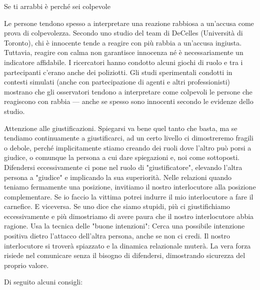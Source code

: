 \documentclass[12pt]{book} %
\begin{document}
\begin{mdframed}[linewidth=1pt]
Se ti arrabbi è perché sei colpevole

Le persone tendono spesso a interpretare una reazione rabbiosa a un'accusa come prova di colpevolezza. Secondo uno studio del team di DeCelles (Università di Toronto), chi è innocente tende a reagire con più rabbia a un'accusa ingiusta. Tuttavia, reagire con calma non garantisce innocenza né è necessariamente un indicatore affidabile. I ricercatori hanno condotto alcuni giochi di ruolo e
tra i partecipanti c'erano anche dei poliziotti. Gli studi sperimentali condotti in contesti simulati (anche con partecipazione di agenti e altri professionisti) mostrano che gli osservatori tendono a interpretare come colpevoli le persone che reagiscono con rabbia — anche se spesso sono innocenti secondo le evidenze dello studio. 

Attenzione alle giustificazioni. Spiegarsi va bene quel tanto che basta, ma se tendiamo continuamente a giustificarci, ad un certo livello ci dimostreremo fragili o debole, perché implicitamente stiamo creando dei ruoli dove l'altro può porsi a giudice, o comunque la persona a cui dare spiegazioni e, noi come sottoposti. 
Difendersi eccessivamente ci pone nel ruolo di "giustificatore", elevando l'altra persona a "giudice" e implicando la sua superiorità. 
Nelle relazioni quando teniamo fermamente una posizione, invitiamo il nostro interlocutore alla posizione complementare. 
Se io faccio la vittima potrei indurre il mio interlocutore a fare il carnefice. E viceversa.
Se uno dice che siamo stupidi, più ci giustifichiamo eccessivamente e più dimostriamo di avere paura che il nostro interlocutore abbia ragione.
Usa la tecnica delle "buone intenzioni": Cerca una possibile intenzione positiva dietro l'attacco dell'altra persona, anche se non ci credi. Il nostro interlocutore si troverà spiazzato e la dinamica relazionale muterà.
La vera forza risiede nel comunicare senza il bisogno di difendersi, dimostrando sicurezza del proprio valore.
\end{mdframed}

Di seguito alcuni consigli:
\end{document}
